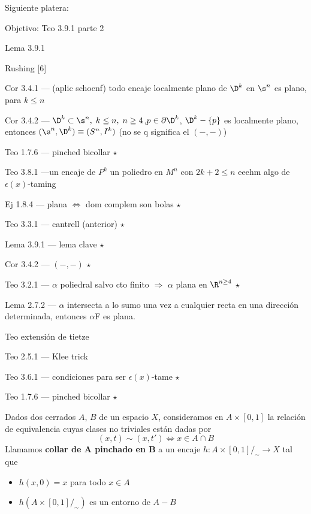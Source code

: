 Siguiente platera:

Objetivo: Teo 3.9.1 parte 2

Lema 3.9.1

Rushing [6]

Cor 3.4.1 --- (aplic schoenf) todo encaje localmente plano de $\D^k$ en $\s^n$ es plano, para $k\leq n$

Cor 3.4.2 --- $\D^k\subset\s^n,\; k\leq n,\; n\geq 4$,$p\in\partial\D^k$, $\D^k-\{p\}$ es localmente plano, entonces $(\s^n, \D^k)\equiv (S^n,I^k)$ (no se q significa el $(-,-)$)

Teo 1.7.6 --- pinched bicollar $\star$

Teo 3.8.1 ---un encaje de $P^k$ un poliedro en $M^n$ con $2k+2\leq n$  eeehm algo de $\epsilon(x)$-taming

Ej 1.8.4 --- plana $\iff$ dom complem son bolas $\star$

Teo 3.3.1 --- cantrell (anterior) $\star$

Lema 3.9.1 --- lema clave $\star$

Cor 3.4.2 --- $(-,-)$ $\star$

Teo 3.2.1 --- $\alpha$ poliedral salvo cto finito $\Rightarrow$ $\alpha$ plana en $\R^{n\geq 4}$ $\star$

Lema 2.7.2 --- $\alpha$ intersecta a lo sumo una vez a cualquier recta en una dirección determinada, entonces $\alpha$F es plana.

Teo extensión de tietze

Teo 2.5.1 --- Klee trick

Teo 3.6.1 --- condiciones para ser $\epsilon(x)$-tame $\star$

Teo 1.7.6 --- pinched bicollar $\star$








\begin{df}
Dados dos cerrados $A$, $B$ de un espacio $X$, consideramos en $A\times[0,1]$ la relación de equivalencia cuyas clases no triviales están dadas por $$(x,t)\sim (x,t')\iff x\in A\cap B$$
Llamamos \textbf{collar de A pinchado en B} a un encaje $h\colon A\times[0,1]/_{\sim}\to X$ tal que \begin{itemize}
\item $h(x,0)=x$ para todo $x\in A$
\item $h(A\times [0,1]/_\sim)$ es un entorno de $A - B$
\end{itemize}
\end{df} 

